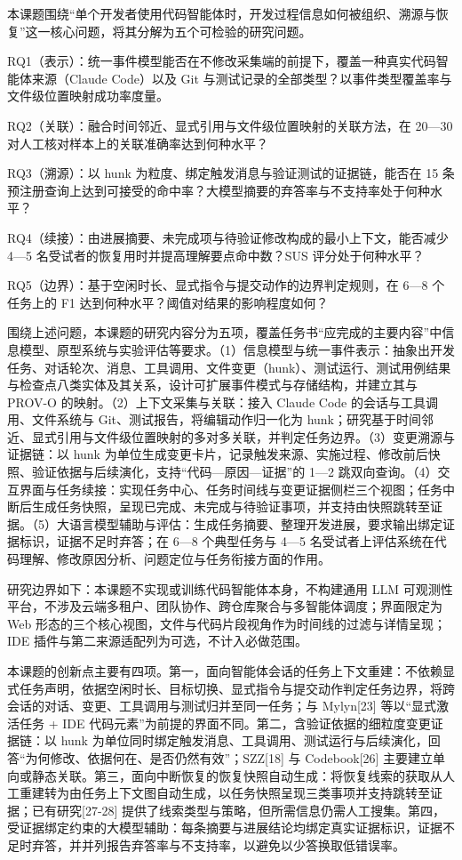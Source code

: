 

本课题围绕“单个开发者使用代码智能体时，开发过程信息如何被组织、溯源与恢复”这一核心问题，将其分解为五个可检验的研究问题。

RQ1（表示）：统一事件模型能否在不修改采集端的前提下，覆盖一种真实代码智能体来源（Claude Code）以及 Git 与测试记录的全部类型？以事件类型覆盖率与文件级位置映射成功率度量。

RQ2（关联）：融合时间邻近、显式引用与文件级位置映射的关联方法，在 20—30 对人工核对样本上的关联准确率达到何种水平？

RQ3（溯源）：以 hunk 为粒度、绑定触发消息与验证测试的证据链，能否在 15 条预注册查询上达到可接受的命中率？大模型摘要的弃答率与不支持率处于何种水平？

RQ4（续接）：由进展摘要、未完成项与待验证修改构成的最小上下文，能否减少 4—5 名受试者的恢复用时并提高理解要点命中数？SUS 评分处于何种水平？

RQ5（边界）：基于空闲时长、显式指令与提交动作的边界判定规则，在 6—8 个任务上的 F1 达到何种水平？阈值对结果的影响程度如何？

围绕上述问题，本课题的研究内容分为五项，覆盖任务书“应完成的主要内容”中信息模型、原型系统与实验评估等要求。（1）信息模型与统一事件表示：抽象出开发任务、对话轮次、消息、工具调用、文件变更（hunk）、测试运行、测试用例结果与检查点八类实体及其关系，设计可扩展事件模式与存储结构，并建立其与 PROV-O 的映射。（2）上下文采集与关联：接入 Claude Code 的会话与工具调用、文件系统与 Git、测试报告，将编辑动作归一化为 hunk；研究基于时间邻近、显式引用与文件级位置映射的多对多关联，并判定任务边界。（3）变更溯源与证据链：以 hunk 为单位生成变更卡片，记录触发来源、实施过程、修改前后快照、验证依据与后续演化，支持“代码—原因—证据”的 1—2 跳双向查询。（4）交互界面与任务续接：实现任务中心、任务时间线与变更证据侧栏三个视图；任务中断后生成任务快照，呈现已完成、未完成与待验证事项，并支持由快照跳转至证据。（5）大语言模型辅助与评估：生成任务摘要、整理开发进展，要求输出绑定证据标识，证据不足时弃答；在 6—8 个典型任务与 4—5 名受试者上评估系统在代码理解、修改原因分析、问题定位与任务衔接方面的作用。

研究边界如下：本课题不实现或训练代码智能体本身，不构建通用 LLM 可观测性平台，不涉及云端多租户、团队协作、跨仓库聚合与多智能体调度；界面限定为 Web 形态的三个核心视图，文件与代码片段视角作为时间线的过滤与详情呈现；IDE 插件与第二来源适配列为可选，不计入必做范围。

本课题的创新点主要有四项。第一，面向智能体会话的任务上下文重建：不依赖显式任务声明，依据空闲时长、目标切换、显式指令与提交动作判定任务边界，将跨会话的对话、变更、工具调用与测试归并至同一任务；与 Mylyn[23] 等以“显式激活任务 + IDE 代码元素”为前提的界面不同。第二，含验证依据的细粒度变更证据链：以 hunk 为单位同时绑定触发消息、工具调用、测试运行与后续演化，回答“为何修改、依据何在、是否仍然有效”；SZZ[18] 与 Codebook[26] 主要建立单向或静态关联。第三，面向中断恢复的恢复快照自动生成：将恢复线索的获取从人工重建转为由任务上下文图自动生成，以任务快照呈现三类事项并支持跳转至证据；已有研究[27-28] 提供了线索类型与策略，但所需信息仍需人工搜集。第四，受证据绑定约束的大模型辅助：每条摘要与进展结论均绑定真实证据标识，证据不足时弃答，并并列报告弃答率与不支持率，以避免以少答换取低错误率。

